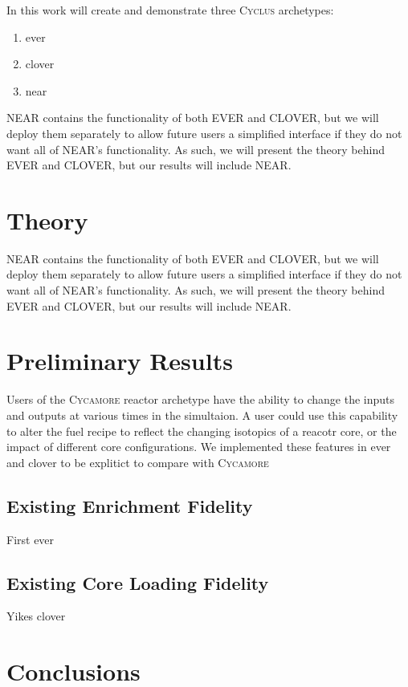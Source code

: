 \documentclass{anstrans}
\newcommand{\cyclus}{\textsc{Cyclus}\xspace} %
\newcommand{\cycamore}{\textsc{Cycamore}\xspace} %
\begin{document}
In this work will create and demonstrate three \cyclus archetypes:
\begin{enumerate}
    \item \gls{ever}
    \item \gls{clover}
    \item \gls{near}
\end{enumerate}

NEAR contains the functionality of both EVER and CLOVER, but we will deploy
them separately to allow future users a simplified interface if they do not
want all of NEAR's functionality. As such, we will present the theory behind
EVER and CLOVER, but our results will include NEAR.


\section{Theory}


NEAR contains the functionality of both EVER and CLOVER, but we will deploy
them separately to allow future users a simplified interface if they do not
want all of NEAR's functionality. As such, we will present the theory behind
EVER and CLOVER, but our results will include NEAR.


\section{Preliminary Results}

Users of the \cycamore reactor archetype have the ability to change the inputs and outputs at various times in the simultaion. A user could use this capability to alter the fuel recipe to reflect the changing isotopics of a reacotr core, or the impact of different core configurations. We implemented these features in \gls{ever} and \gls{clover} to be explitict to compare with \cycamore


\subsection{Existing Enrichment Fidelity}

First
\gls{ever}


\subsection{Existing Core Loading Fidelity}

Yikes
\gls{clover}


\section{Conclusions}
\end{document}
